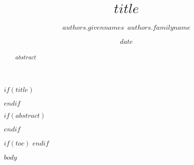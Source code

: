 \documentclass[11pt]{article}
\title{$title$}
\date{$date$}
\author[$for(authors.affiliations)$$authors.affiliations$$sep$,$endfor$]{$authors.givennames$~$authors.familyname$}
\affil[$affiliations.index$]{$affiliations.name$}
\begin{document}
$if(title)$
\maketitle
$endif$

$if(abstract)$
\begin{abstract}
$abstract$
\end{abstract}
$endif$

$if(toc)$
\tableofcontents
$endif$


\linenumbers

$body$
\end{document}
